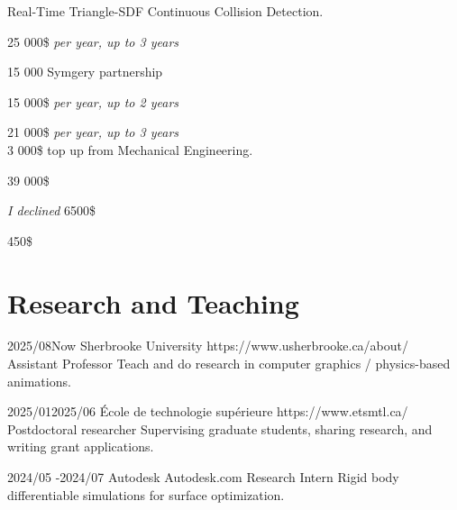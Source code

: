 \documentclass[10pt]{article} %
\begin{document}
{
 Real-Time Triangle-SDF Continuous Collision Detection. \\
}

{
 25 000\$ \textit{per year, up to 3 years} \\
}

{
 15 000 Symgery partnership \\
}

{
 15 000\$ \textit{per year, up to 2 years} \\
}

{
 21 000\$ \textit{per year, up to 3 years} \\
 3 000\$ top up from Mechanical Engineering.\\
}

{
\textit{} 39 000\$\\
}

{
\textit{I declined} 6500\$\\
}

{
\textit{} 450\$\\
}


\section{Research and Teaching}
\job
{2025/08}{Now}
{Sherbrooke University}
{https://www.usherbrooke.ca/about/}
{Assistant Professor}
{Teach and do research in computer graphics / physics-based animations.}

\job
{2025/01}{2025/06}
{École de technologie supérieure}
{https://www.etsmtl.ca/}
{Postdoctoral researcher}
{Supervising graduate students, sharing research, and writing grant applications.}

\job
{2024/05 -}{2024/07}
{Autodesk}
{Autodesk.com}
{Research Intern}
{Rigid body differentiable simulations for surface optimization.}
\end{document}
